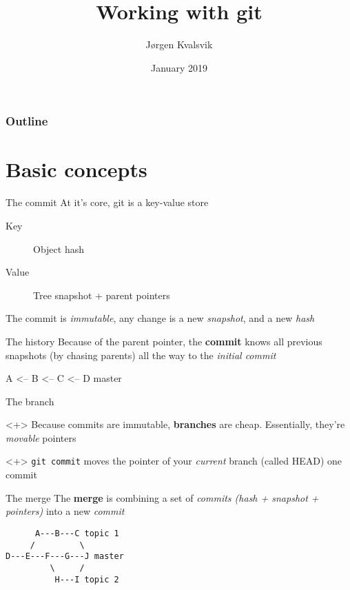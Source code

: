 \documentclass[pdf]{beamer}
\title{Working with git}
\author{Jørgen Kvalsvik}
\date{January 2019}
\begin{document}
\maketitle

\begin{frame}
    \frametitle{Outline}
    \tableofcontents
\end{frame}

\section{Basic concepts}
\tableofcontents[currentsection]

\begin{frame}{The commit}
    At it's core, git is a key-value store

    \begin{description}
        \item [Key] Object hash
        \item [Value] Tree snapshot + parent pointers
    \end{description}

    \pause
    The commit is \emph{immutable}, any change is a new \emph{snapshot}, and a
    new \emph{hash}
\end{frame}

\begin{frame}[fragile]{The history}
    Because of the parent pointer, the \textbf{commit} knows all previous
    snapshots (by chasing parents) all the way to the \emph{initial commit}

    \begin{block}
        {A <-- B <-- C <-- D master}
    \end{block}
\end{frame}

\begin{frame}[fragile]{The branch}
    \begin{block}{}<+>
        Because commits are immutable, \textbf{branches} are cheap.
        Essentially, they're \emph{movable} pointers
    \end{block}

    \begin{block}{}<+>
        \verb|git commit| moves the pointer of your \emph{current} branch (called
        HEAD) one commit
    \end{block}
\end{frame}

\begin{frame}[fragile]{The merge}
The \textbf{merge} is combining a set of \emph{commits (hash + snapshot +
pointers)} into a new \emph{commit}

\begin{verbatim}
      A---B---C topic 1
     /         \
D---E---F---G---J master
         \     /
          H---I topic 2
\end{verbatim}
\end{frame}
\end{document}
